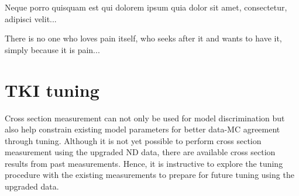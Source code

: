 \begin{savequote}[8cm]
\textlatin{Neque porro quisquam est qui dolorem ipsum quia dolor sit amet, consectetur, adipisci velit...}

There is no one who loves pain itself, who seeks after it and wants to have it, simply because it is pain...
\end{savequote}

\chapter{\label{ch:tuning}TKI tuning} 

\minitoc

Cross section measurement can not only be used for model discrimination but also help constrain existing model parameters for better data-MC agreement through tuning. 
Although it is not yet possible to perform cross section measurement using the upgraded ND data, there are available cross section results from past measurements. 
Hence, it is instructive to explore the tuning procedure with the existing measurements to prepare for future tuning using the upgraded data. 

